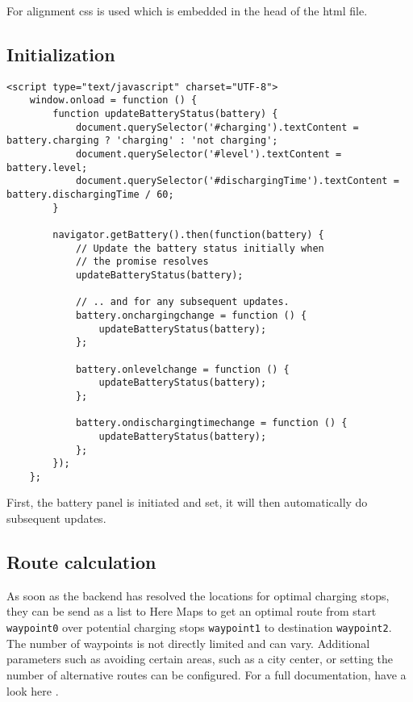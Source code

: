 For alignment css is used which is embedded in the head of the html file.

\subsection{Initialization}

\begin{verbatim}
<script type="text/javascript" charset="UTF-8">
    window.onload = function () {
        function updateBatteryStatus(battery) {
            document.querySelector('#charging').textContent = battery.charging ? 'charging' : 'not charging';
            document.querySelector('#level').textContent = battery.level;
            document.querySelector('#dischargingTime').textContent = battery.dischargingTime / 60;
        }

        navigator.getBattery().then(function(battery) {
            // Update the battery status initially when
            // the promise resolves
            updateBatteryStatus(battery);

            // .. and for any subsequent updates.
            battery.onchargingchange = function () {
                updateBatteryStatus(battery);
            };

            battery.onlevelchange = function () {
                updateBatteryStatus(battery);
            };

            battery.ondischargingtimechange = function () {
                updateBatteryStatus(battery);
            };
        });
    };
\end{verbatim}

First, the battery panel is initiated and set, it will then automatically do subsequent updates. 


\subsection{Route calculation}

As soon as the backend has resolved the locations for optimal charging stops, they can be send as a list to Here Maps to get an optimal route from start \texttt{waypoint0} over potential charging stops \texttt{waypoint1} to destination \texttt{waypoint2}. The number of waypoints is not directly limited and can vary. Additional parameters such as avoiding certain areas, such as a city center, or setting the number of alternative routes can be configured. For a full documentation, have a look here \cite{driver-13}.

